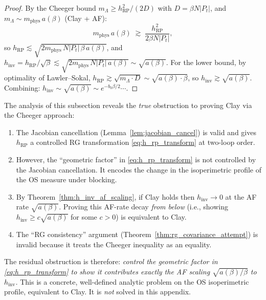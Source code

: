 \begin{proof}
By the Cheeger bound $m_{\Lambda}\ge h_{\mathrm{RP}}^{2}/(2D)$
with $D=\beta N|P_{t}|$, and $m_{\Lambda}\sim m_{\mathrm{phys}}\,
a(\beta)$ (Clay + AF):
\[
  m_{\mathrm{phys}}\,a(\beta)\;\gtrsim\;\frac{h_{\mathrm{RP}}^{2}}{2\beta N|P_{t}|},
\]
so $h_{\mathrm{RP}}\lesssim\sqrt{2m_{\mathrm{phys}}\,N|P_{t}|\,\beta\,a(\beta)}$,
and $h_{\mathrm{inv}}=h_{\mathrm{RP}}/\sqrt{\beta}\lesssim
\sqrt{2m_{\mathrm{phys}}\,N|P_{t}|\,a(\beta)}\sim\sqrt{a(\beta)}$.
For the lower bound, by optimality of Lawler--Sokal,
$h_{\mathrm{RP}}\gtrsim\sqrt{m_{\Lambda}\cdot D}\sim\sqrt{a(\beta)\cdot\beta}$,
so $h_{\mathrm{inv}}\gtrsim\sqrt{a(\beta)}$. Combining:
$h_{\mathrm{inv}}\sim\sqrt{a(\beta)}\sim e^{-b_{0}\beta/2}\cdots$.
\end{proof}

\begin{remark}
\label{rem:rg_honest_revised}
The analysis of this subsection reveals the \emph{true}
obstruction to proving Clay via the Cheeger approach:
\begin{enumerate}
\item The Jacobian cancellation (Lemma~\ref{lem:jacobian_cancel})
is valid and gives $h_{\mathrm{RP}}$ a controlled RG
transformation \eqref{eq:h_rp_transform} at two-loop order.
\item However, the ``geometric factor'' in
\eqref{eq:h_rp_transform} is not controlled by the Jacobian
cancellation. It encodes the change in the isoperimetric profile
of the OS measure under blocking.
\item By Theorem~\ref{thm:h_inv_af_scaling}, if Clay holds then
$h_{\mathrm{inv}}\to0$ at the AF rate $\sqrt{a(\beta)}$. Proving
this AF-rate decay \emph{from below} (i.e., showing
$h_{\mathrm{inv}}\ge c\sqrt{a(\beta)}$ for some $c>0$) is
equivalent to Clay.
\item The ``RG consistency'' argument
(Theorem~\ref{thm:rg_covariance_attempt}) is invalid because it
treats the Cheeger inequality as an equality.
\end{enumerate}
The residual obstruction is therefore: \emph{control the
geometric factor in \eqref{eq:h_rp_transform} to show it
contributes exactly the AF scaling $\sqrt{a(\beta)/\beta}$ to
$h_{\mathrm{inv}}$.} This is a concrete, well-defined analytic
problem on the OS isoperimetric profile, equivalent to Clay.
It is \emph{not} solved in this appendix.
\end{remark}

